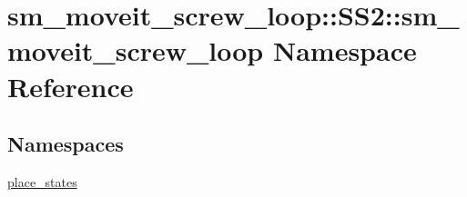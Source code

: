 \hypertarget{namespacesm__moveit__screw__loop_1_1SS2_1_1sm__moveit__screw__loop}{}\section{sm\+\_\+moveit\+\_\+screw\+\_\+loop\+:\+:S\+S2\+:\+:sm\+\_\+moveit\+\_\+screw\+\_\+loop Namespace Reference}
\label{namespacesm__moveit__screw__loop_1_1SS2_1_1sm__moveit__screw__loop}
\subsection*{Namespaces}
\begin{DoxyCompactItemize}
\item 
 \hyperlink{namespacesm__moveit__screw__loop_1_1SS2_1_1sm__moveit__screw__loop_1_1place__states}{place\+\_\+states}
\end{DoxyCompactItemize}
